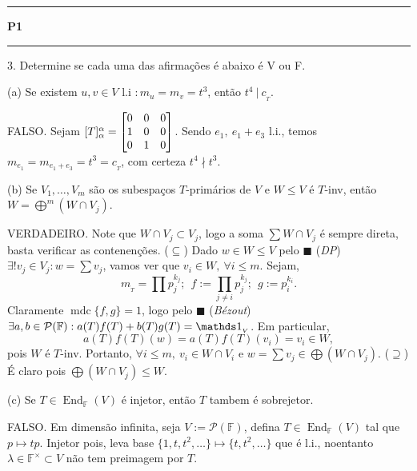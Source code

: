 \newcommand{\F}{\mathbb{F}}
\newcommand{\C}{\mathbb{C}}
\newcommand{\an}{\mathscr{A}} 
\newcommand{\Q}{\mathbb{Q}}
\renewcommand{\hom}{\operatorname{Hom}_\F}
\newcommand{\ehom}{\operatorname{End}_\F}

\-\vspace{-0.3cm}
  {\hrule \vspace{-0.15cm}
  \centering \textbf{P1} \vspace{0.1cm}
  \hrule}

3. Determine se cada uma das afirmações é abaixo é V ou F. 

(a) Se existem \(u,v \in V \) l.i \(: m_u = m_v= t^3\), então \(t^4 \ |\ c_{_T}\). 

\textcolor{gris}{FALSO. Sejam \([T]^\alpha_\alpha = \hspace{-0cm}\begin{bmatrix}
    0 & 0 & 0 \\ 
    1 &0 & 0 \\
    0 &1 & 0 
\end{bmatrix} \). Sendo \( e_1, \ e_1+e_3\) l.i., temos \(m_{e_1} = m_{e_1+e_3} = t^3 =c_{_T}\), com certeza \(t^4 \nmid t^3\).  
}  

(b) Se \(V_1, \ldots, V_m\) são os subespaços \(T\)-primários de \(V\) e \(W\leq V\) é \(T\)-inv, então \(W = \bigoplus^m (W\cap V_j)\).  

\textcolor{gris}{VERDADEIRO. Note que \(W\cap V_j \subset V_j\), logo a soma \(\sum W\cap V_j\) é sempre direta, basta verificar as contenenções. (\(\subseteq\)) Dado \(w \in W \leq V\) pelo \(\blacksquare\) (\emph{DP}) \(\exists ! v_j \in V_j : w = \sum v_j\), vamos ver que \(v_i \in W, \ \forall i \leq m\). Sejam, 
\[m_{_T} = \prod p_j^{k_j}; \ \ f := \prod_{j\neq i} p_j^{k_j}; \ \ g:= p_i^{k_i}. \]  
Claramente \(\operatorname{mdc}\{f,g\} = 1\), logo pelo \(\blacksquare\) (\emph{Bézout}) \(\exists a, b \in \mathcal{P}(\F) : a(T)f(T) + b(T)g(T) = \id_{_V} \). Em particular, 
\[a(T)f(T) (w) = a(T)f(T)(v_i) = v_i \in W,\] 
pois \(W \) é \(T\)-inv. Portanto, \(\forall i \leq m, \ v_i \in W \cap V_i\) e \(w = \sum v_j \in \bigoplus (W\cap V_j)\).  (\(\supseteq \)) É claro pois \(\bigoplus (W\cap V_j) \leq W\). 
}  

(c) Se \(T \in \ehom(V)\) é injetor, então \(T\) tambem é sobrejetor.  

\textcolor{gris}{FALSO. Em dimensão infinita, seja \(V:= \mathcal{P}(\F)\), defina \(T\in \ehom(V) \) tal que \(p \mapsto tp\). Injetor pois, leva base \(\{1, t, t^2, \ldots\} \mapsto \{t, t^2, \ldots\}\) que é l.i., noentanto \(\lambda \in \F^\times \subset V\) não tem preimagem por \(T\).  
} 

